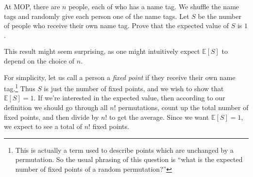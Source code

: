 \documentclass[11pt]{scrartcl}
\newcommand\EE{\mathbb E}
\begin{document}
\begin{example}
	At MOP, there are $n$ people, each of who has a name tag.
	We shuffle the name tags and randomly give each person one of the name tags.
	Let $S$ be the number of people who receive their own name tag.
	Prove that the expected value of $S$ is $1$.
\end{example}

This result might seem surprising, as one might intuitively expect $\EE[S]$ to depend on the choice of $n$.

For simplicity, let us call a person a \emph{fixed point} if they receive their own name tag.\footnote{This is actually a term used to describe points which are unchanged by a permutation. So the usual phrasing of this question is ``what is the expected number of fixed points of a random permutation?''} 
Thus $S$ is just the number of fixed points, and we wish to show that $\EE[S]=1$.
If we're interested in the expected value, then according to our definition we should go through all $n!$ permutations, count up the total number of fixed points, and then divide by $n!$ to get the average.
Since we want $\EE[S] = 1$, we expect to see a total of $n!$ fixed points.
\end{document}
